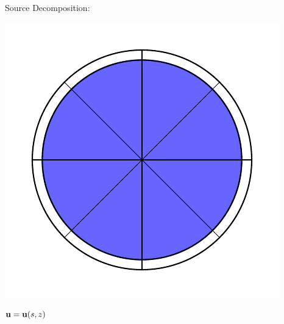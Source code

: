 \documentclass{article}
\renewcommand{\vec}[1]{\ensuremath{\mathbf{#1}}}
\begin{document}
\begin{center}
    \begin{minipage}[t]{0.4\paperwidth}
        Source Decomposition:\\
        \begin{minipage}[c]{0.1\paperwidth}
            \includegraphics[width=\textwidth]{radpat_mono.pdf}%
        \end{minipage}%
        \begin{minipage}[c]{0.4\paperwidth}
            $\scriptsize{\vec u = \vec u (s,z)}$ \\
        \end{minipage}


\end{minipage}
\end{center}
\end{document}
